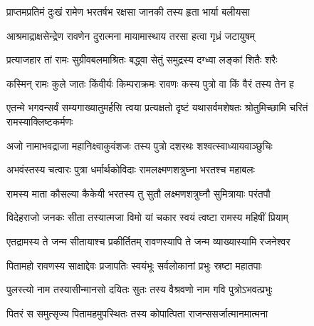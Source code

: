 
\translink{}



\twolineshloka
{प्राप्तमप्रतिमं दुःखं रामेण भरतर्षभ}
{रक्षसा जानकी तस्य हृता भार्या बलीयसा}


\twolineshloka
{आश्रमाद्राक्षसेन्द्रेण रावणेन दुरात्मना}
{मायामास्थाय तरसा हत्वा गृध्रं जटायुषम्}


\twolineshloka
{प्रत्याजहार तां रामः सुग्रीवबलमाश्रितः}
{बद्ध्वा सेतुं समुद्रस्य दग्ध्वा लङ्कां शितैः शरैः}



\twolineshloka
{कस्मिन् रामः कुले जातः किंवीर्यः किम्पराक्रमः}
{रावणः कस्य पुत्रो वा किं वैरं तस्य तेन ह}


\threelineshloka
{एतन्मे भगवन्सर्वं सम्यगाख्यातुमर्हसि}
{त्वया प्रत्यक्षतो दृष्टं यथासर्वमशेषतः}
{श्रोतुमिच्छामि चरितं रामस्याक्लिष्टकर्मणः}



\twolineshloka
{अजो नामाभवद्राजा महानिक्ष्वाकुवंशजः}
{तस्य पुत्रो दशरथः शश्वत्स्वाध्यायवाञ्छुचिः}


\twolineshloka
{अभवंस्तस्य चत्वारः पुत्रा धर्मार्थकोविदाः}
{रामलक्ष्मणशत्रुघ्ना भरतश्च महाबलः}


\twolineshloka
{रामस्य माता कौसल्या कैकेयी भरतस्य तु}
{सुतौ लक्ष्मणशत्रुघ्नौ सुमित्रायाः परंतपौ}


\twolineshloka
{विदेहराजो जनकः सीता तस्यात्मजा विमो}
{यां चकार स्वयं त्वष्टा रामस्य महिषीं प्रियाम्}


\twolineshloka
{एतद्रामस्य ते जन्म सीतायाश्च प्रकीर्तितम्}
{रावणस्यापि ते जन्म व्याख्यास्यामि रजनेश्वर}


\twolineshloka
{पितामहो रावणस्य साक्षाद्देवः प्रजापतिः}
{स्वयंभूः सर्वलोकानां प्रभुः स्रष्टा महातपाः}


\twolineshloka
{पुलस्त्यो नाम तस्यासीन्मानसो दयितः सुतः}
{तस्य वैश्रवणो नाम गवि पुत्रोऽभवत्प्रभुः}


\twolineshloka
{पितरं स समुत्सृज्य पितामहमुपस्थितः}
{तस्य कोपात्पिता राजन्ससर्जात्मानमात्मना}


